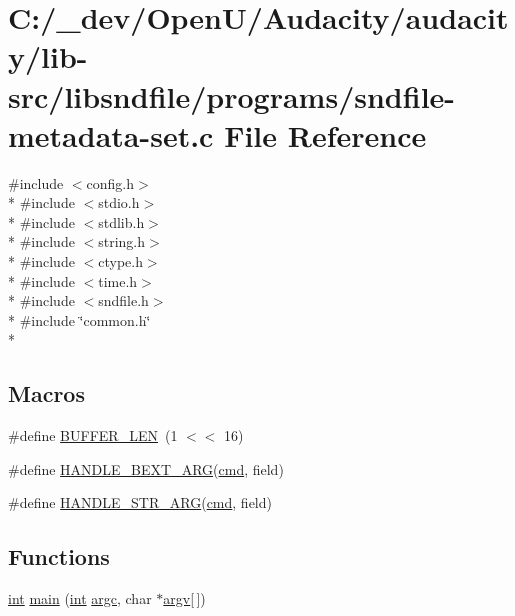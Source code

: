 \hypertarget{sndfile-metadata-set_8c}{}\section{C\+:/\+\_\+dev/\+Open\+U/\+Audacity/audacity/lib-\/src/libsndfile/programs/sndfile-\/metadata-\/set.c File Reference}
\label{sndfile-metadata-set_8c}
{\ttfamily \#include $<$config.\+h$>$}\\*
{\ttfamily \#include $<$stdio.\+h$>$}\\*
{\ttfamily \#include $<$stdlib.\+h$>$}\\*
{\ttfamily \#include $<$string.\+h$>$}\\*
{\ttfamily \#include $<$ctype.\+h$>$}\\*
{\ttfamily \#include $<$time.\+h$>$}\\*
{\ttfamily \#include $<$sndfile.\+h$>$}\\*
{\ttfamily \#include \char`\"{}common.\+h\char`\"{}}\\*
\subsection*{Macros}
\begin{DoxyCompactItemize}
\item 
\#define \hyperlink{sndfile-metadata-set_8c_a46130dc86f2322714bba26960b64e7bb}{B\+U\+F\+F\+E\+R\+\_\+\+L\+EN}~(1 $<$$<$ 16)
\item 
\#define \hyperlink{sndfile-metadata-set_8c_ace53d6b935500313390dd05c29fe98bd}{H\+A\+N\+D\+L\+E\+\_\+\+B\+E\+X\+T\+\_\+\+A\+RG}(\hyperlink{sndfile__play_8m_adfc5ba7e22f5e4a6221c12a70503bef3}{cmd},  field)
\item 
\#define \hyperlink{sndfile-metadata-set_8c_aecaa0327c44dbb04edc80eeccf26da72}{H\+A\+N\+D\+L\+E\+\_\+\+S\+T\+R\+\_\+\+A\+RG}(\hyperlink{sndfile__play_8m_adfc5ba7e22f5e4a6221c12a70503bef3}{cmd},  field)
\end{DoxyCompactItemize}
\subsection*{Functions}
\begin{DoxyCompactItemize}
\item 
\hyperlink{xmltok_8h_a5a0d4a5641ce434f1d23533f2b2e6653}{int} \hyperlink{sndfile-metadata-set_8c_a0ddf1224851353fc92bfbff6f499fa97}{main} (\hyperlink{xmltok_8h_a5a0d4a5641ce434f1d23533f2b2e6653}{int} \hyperlink{cmdline_8c_aaffeb1bf2056ea44af5b5d0ee4d6ff07}{argc}, char $\ast$\hyperlink{cmdline_8c_ad407d5ba91709bd9b092003858600723}{argv}\mbox{[}$\,$\mbox{]})
\end{DoxyCompactItemize}


